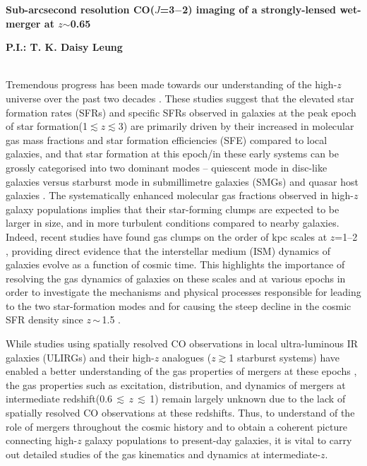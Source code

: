 \documentclass[11pt,a4paper,twoside,graphicx,color]{article}
\newcommand{\cco}{\mbox{CO($J$=3$-$2)}\xspace}
\newcommand{\ssim}{\,$\sim$\,}
\newcommand{\SF}{star formation\xspace}
\newcommand{\galpop}{galaxy populations\xspace}
\newcommand{\SB}{starburst\xspace}
\newcommand{\highz}{high-$z$\xspace}
\newcommand{\atinterz}{at intermediate redshift\xspace}
\newcommand{\obs}{observations\xspace}
\begin{document}
%
%
\begin{center}{\huge \bf
Sub-arcsecond resolution \cco imaging of a strongly-lensed wet-merger at $z$$\sim$0.65
}\end{center}
\centerline{\bf P.I.: T. K. Daisy Leung}

 \\
\indent Tremendous progress has been made towards our understanding of the \highz
universe over the past two decades \citep[see recent reviews by][]{CW13,Madau14a, Casey14a}. These studies
suggest that the elevated \SF rates (SFRs) and specific SFRs observed in galaxies at
the peak epoch of \SF (1$\lesssim$$z$$\lesssim$3) are
primarily driven by their increased in molecular gas mass fractions and \SF efficiencies (SFE) compared to
local galaxies, and that \SF at this epoch/in these early systems can be grossly categorised into
two dominant modes -- quiescent mode in disc-like galaxies versus starburst mode in submillimetre galaxies (SMGs) and quasar host galaxies \citep[e.g.][]{Sargent12a}. 
The systematically enhanced molecular gas fractions observed in \highz
\galpop implies that their star-forming clumps are expected to be larger in size, and in
more turbulent conditions 
compared to nearby galaxies.  %
Indeed, recent studies have found gas clumps on the order of kpc scales at $z$=1--2 \citep[e.g.][]{Swinbank12a, Swinbank12b}, providing direct evidence that the
interstellar medium (ISM) dynamics of galaxies evolve as a function of cosmic time. This
highlights the importance of resolving the gas dynamics of galaxies on these scales 
and at various epochs in order to investigate the
mechanisms and physical processes responsible for leading to
the two star-formation modes and for causing the steep decline in the cosmic SFR density since $z$\ssim1.5 \citep[e.g.][]{Lagos11a,Popping12a}.

While studies using spatially resolved CO \obs in
local ultra-luminous IR galaxies (ULIRGs) and their \highz analogues ($z$$\gtrsim$1 \SB systems)
have enabled a better understanding of the gas properties of mergers at these epochs \citep[e.g.][]{Engel10a,Bothwell10a},
the gas properties such as excitation, distribution, and dynamics of mergers 
\atinterz (0.6\,$\lesssim$\,$z$\,$\lesssim$\,1) remain largely unknown
due to the lack of spatially resolved CO observations at these redshifts.
Thus, to understand of the role of mergers throughout the cosmic history and
to obtain a coherent picture connecting \highz \galpop to present-day galaxies, 
it is vital to carry out detailed studies of the gas kinematics and dynamics at intermediate-$z$.
\end{document}
